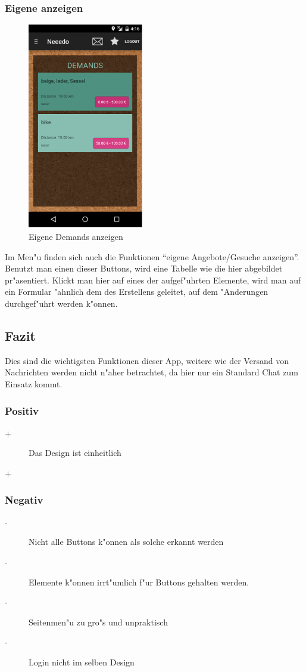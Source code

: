 \subsubsection{Eigene anzeigen}

\begin{figure}[h]
\begin{center}
\includegraphics[width=0.45\textwidth]{./Bilder/liste.png}
\caption{Eigene Demands anzeigen}
\label{fig:anzeigen}
\end{center}
\end{figure}

Im Men"u finden sich auch die Funktionen \enquote{eigene Angebote/Gesuche anzeigen}. 
Benutzt man einen dieser Buttons, wird eine Tabelle wie die hier abgebildet pr"asentiert.
Klickt man hier auf eines der aufgef"uhrten Elemente, wird man auf ein Formular "ahnlich dem des Erstellens geleitet, auf dem "Anderungen durchgef"uhrt werden k"onnen. 


\subsection{Fazit}

Dies sind die wichtigsten Funktionen dieser App, weitere wie der Versand von Nachrichten werden nicht n"aher betrachtet, da hier nur ein Standard Chat zum Einsatz kommt. 

\subsubsection{Positiv}\begin{description}
\item[+] Das Design ist einheitlich 
\item[+] 
\end{description}

\subsubsection{Negativ}\begin{description}
\item[-] Nicht alle Buttons k"onnen als solche erkannt werden
\item[-] Elemente k"onnen irrt"umlich f"ur Buttons gehalten werden.
\item[-] Seitenmen"u zu gro"s und unpraktisch 
\item[-] Login nicht im selben Design
\end{description}

